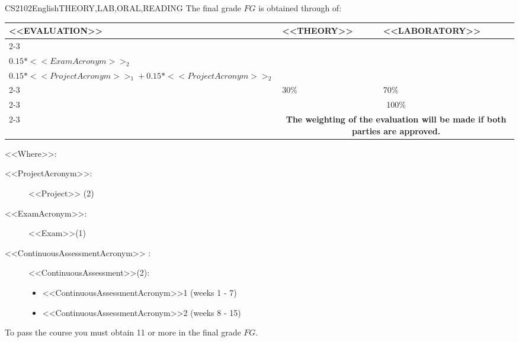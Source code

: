   \begin{evaluation}{CS2102}{English}{THEORY,LAB,ORAL,READING}
  The final grade $FG$ is obtained through of:
 
  \begin{tabularx}{0.9\textwidth}{|X|p{}|p{}|} \hline
  \multirow{4}{*}{\uppercase{<<Evaluation>>}} & \uppercase{<<Theory>>} & \uppercase{<<Laboratory>>} \\ \cline{2-3}
  & %
      \begin{minipage}{0.95\textwidth}
      \begin{tabular}{l}
          $0.15*<<ExamAcronym>>_{1}$ + \\  
          $0.15*<<ExamAcronym>>_{2}$
      \end{tabular} 
      \end{minipage} 
  & %
      \begin{minipage}{0.95\textwidth}
      \begin{tabular}{l}
          $0.20*<<ContinuousAssessmentAcronym>>_{1} + 0.20*<<ContinuousAssessmentAcronym>>_{2}$  +\\
          $0.15*<<ProjectAcronym>>_{1} + 0.15*<<ProjectAcronym>>_{2}$
          \end{tabular} 
      \end{minipage}                 \\ \cline{2-3}
  
  & %
  30\% 
  & %
  70\% \\ \cline{2-3}
  & \multicolumn{2}{c|}{100\%}  \\ \cline{2-3}
  & \multicolumn{2}{c|}{\textbf{The weighting of the evaluation will be made if both parties are approved.}}  \\ \hline
  \end{tabularx}
  
  \vspace{2mm}
  \noindent <<Where>>:
  \begin{description}
    \item[<<ProjectAcronym>>:] <<Project>> (2)  
    \item[<<ExamAcronym>>:] <<Exam>>(1) 
    \item[<<ContinuousAssessmentAcronym>> :] <<ContinuousAssessment>>(2):
      \begin{itemize}
            \item  <<ContinuousAssessmentAcronym>>1 (weeks 1 - 7) 
            \item <<ContinuousAssessmentAcronym>>2 (weeks 8 - 15) 
      \end{itemize}
  \end{description}

  \noindent To pass the course you must obtain 11 or more in the final grade $FG$.
  \end{evaluation}


